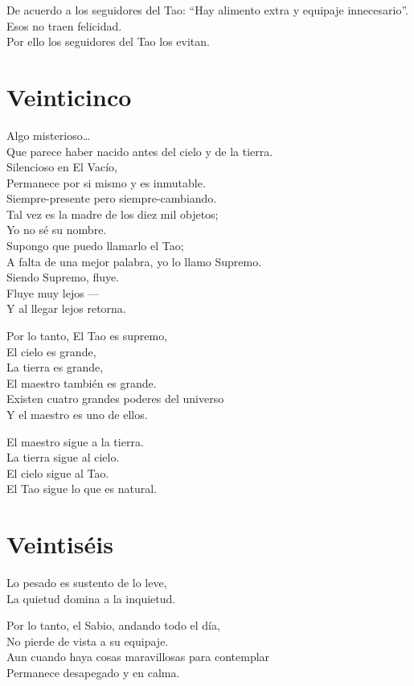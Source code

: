 \documentclass[book,b5paper,hidelinks,final]{memoir}
\begin{document}
	De acuerdo a los seguidores del Tao: ``Hay alimento extra y equipaje
	innecesario''.\\
	Esos no traen felicidad.\\
	Por ello los seguidores del Tao los evitan.
	
	\chapter*{Veinticinco}
	
	Algo misterioso\ldots{}\\
	Que parece haber nacido antes del cielo y de la tierra.\\
	Silencioso en El Vacío,\\
	Permanece por si mismo y es inmutable.\\
	Siempre-presente pero siempre-cambiando.\\
	Tal vez es la madre de los diez mil objetos;\\
	Yo no sé su nombre.\\
	Supongo que puedo llamarlo el Tao;\\
	A falta de una mejor palabra, yo lo llamo Supremo.\\
	Siendo Supremo, fluye.\\
	Fluye muy lejos ---\\
	Y al llegar lejos retorna.
	
	Por lo tanto, El Tao es supremo,\\
	El cielo es grande,\\
	La tierra es grande,\\
	El maestro también es grande.\\
	Existen cuatro grandes poderes del universo\\
	Y el maestro es uno de ellos.
	
	El maestro sigue a la tierra.\\
	La tierra sigue al cielo.\\
	El cielo sigue al Tao.\\
	El Tao sigue lo que es natural.
	
	\chapter*{Veintiséis}
	
	Lo pesado es sustento de lo leve,\\
	La quietud domina a la inquietud.
	
	Por lo tanto, el Sabio, andando todo el día,\\
	No pierde de vista a su equipaje.\\
	Aun cuando haya cosas maravillosas para contemplar\\
	Permanece desapegado y en calma.
	
\end{document}
